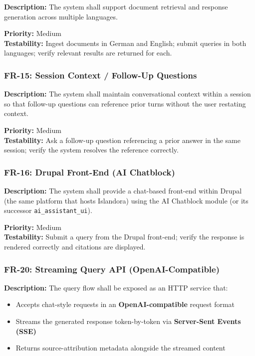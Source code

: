 \documentclass[
  11pt,
]{article}
\providecommand{\tightlist}{%
  \setlength{\itemsep}{0pt}\setlength{\parskip}{0pt}}
\begin{document}
\textbf{Description:} The system shall support document retrieval and
response generation across multiple languages.

\textbf{Priority:} Medium\\
\textbf{Testability:} Ingest documents in German and English; submit
queries in both languages; verify relevant results are returned for
each.

\subsubsection{FR-15: Session Context / Follow-Up
Questions}\label{fr-15-session-context-follow-up-questions}

\textbf{Description:} The system shall maintain conversational context
within a session so that follow-up questions can reference prior turns
without the user restating context.

\textbf{Priority:} Medium\\
\textbf{Testability:} Ask a follow-up question referencing a prior
answer in the same session; verify the system resolves the reference
correctly.

\subsubsection{FR-16: Drupal Front-End (AI
Chatblock)}\label{fr-16-drupal-front-end-ai-chatblock}

\textbf{Description:} The system shall provide a chat-based front-end
within Drupal (the same platform that hosts Islandora) using the AI
Chatblock module (or its successor \texttt{ai\_assistant\_ui}).

\textbf{Priority:} Medium\\
\textbf{Testability:} Submit a query from the Drupal front-end; verify
the response is rendered correctly and citations are displayed.

\subsubsection{FR-20: Streaming Query API
(OpenAI-Compatible)}\label{fr-20-streaming-query-api-openai-compatible}

\textbf{Description:} The query flow shall be exposed as an HTTP service
that:

\begin{itemize}
\tightlist
\item
  Accepts chat-style requests in an \textbf{OpenAI-compatible} request
  format
\item
  Streams the generated response token-by-token via \textbf{Server-Sent
  Events (SSE)}
\item
  Returns source-attribution metadata alongside the streamed content
\end{itemize}
\end{document}
